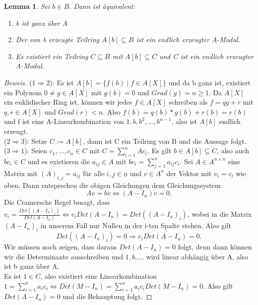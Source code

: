 \documentclass{article}
\newtheorem{lemma}[satz]{Lemma}
\begin{document}
	\begin{lemma} \label{2.1.1}
	Sei \(b \in B\). Dann ist äquivalent:
	\begin{enumerate}
	\item b ist ganz über A
	\item Der von b erzeugte Teilring \(A[b] \subseteq B\) ist ein endlich
	erzeugter A-Modul.
	\item Es existiert ein Teilring \(C \subseteq B\) mit \(A[b] \subseteq C\)
	und C ist ein endlich erzeugter A-Modul.
	\end{enumerate}
	\end{lemma}

	\begin{proof}[Beweis]
	(\(1 \Rightarrow 2\)): Es ist \(A[b] = \{f(b)\;|\;f\in A[X]\}\)
	und da b ganz ist, existiert ein Polynom \(0 \neq g \in A[X]\) mit \(g(b) 
	= 0\) und \(Grad(g) = n \geq 1\). Da \(A[X]\) ein euklidischer Ring ist, können
	wir jedes \(f \in A[X]\) schreiben als \(f = qg + r\) mit \(q,r \in A[X]\)
	und \(Grad(r) < n\). Also \(f(b) = q(b)*g(b) + r(b) = r(b)\) und f ist eine
	A-Linearkombination von \(1, b, b^2, \ldots, b^{n-1}\), also ist \(A[b]\)
	endlich erzeugt. \\
	(\(2 \Rightarrow 3\)): Setze \(C := A[b]\), dann ist C ein Teilring von B
	und die Aussage folgt. \\
	(\(3 \Rightarrow 1\)): Seien \(c_1, \ldots, c_n \in C\) mit \(C =
	\sum_{i=1}^n Ac_i\). Es gilt \(b \in A[b] \subseteq C\), also auch \(bc_i
	\in C\) und es existieren die \(a_{ij} \in A\) mit \(bc_i = \sum_{j=1}^n
	a_{ij}c_i\). Sei \(A \in A^{n\times n}\) eine Matrix mit \((A)_{i,j} =
	a_{ij}\) für alle \(i, j \in \underline{n}\) und \(v \in A^n\) der Vektor
	mit \(v_i = c_i\) wie oben. Dann entsprechen die obigen Gleichungen dem
	Gleichungssystem
	\begin{displaymath}Av = bv \Leftrightarrow (A-I_n)v = 0.\end{displaymath}
	Die Cramersche Regel besagt, dass \(v_i = \frac{Det((A-I_n)_i)}{Det(A-I_n)}
	\Leftrightarrow v_iDet(A-I_n) = Det((A-I_n)_i)\), wobei in die Matrix
	\((A-I_n)_i \) in unserem Fall nur Nullen in der i-ten Spalte stehen. Also
	gilt \begin{displaymath} Det((A-I_n)_i) = 0 \Rightarrow v_iDet(A-I_n) = 0.
	\end{displaymath}
	Wir müssen noch zeigen, dass daraus \(Det(A-I_n) = 0\) folgt, denn dann 
	können wir die Determinante ausschreiben und \(1, b, \ldots\) wird linear
	abhängig über A, also ist b ganz über A. \\
	Es ist \(1 \in C\), also existiert eine Linearkombination \(1 =
	\sum_{i=1}^n a_ic_i \Leftrightarrow Det(M-I_n) = \sum_{i=1}^n
	a_ic_iDet(M-I_n) = 0\). Also gilt \(Det(A-I_n) = 0\) und die
	Behauptung folgt.
	\end{proof}
\end{document}
